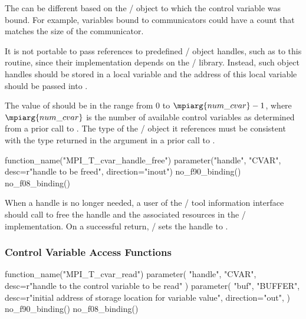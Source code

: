 \begin{users}
The  can be different based on the \MPI/ object to which the
control variable was bound.  For example, variables bound to communicators
could have a count that matches the size of the communicator.

It is not portable to pass references to predefined \MPI/ object handles,
such as  to this routine, since their
implementation depends on the \MPI/ library.  Instead, such object handles
should be stored in a local variable and the address of this local variable
should be passed into .
\end{users}

The value of  should be in the range from $0$ to
$\mpiarg{num\_cvar}-1$, where $\mpiarg{num\_cvar}$ is the number of available control
variables as determined from a prior call to
.  The type of the \MPI/ object it
references must be consistent with the type returned in the 
argument in a prior call to .

\begin{mpi-binding}
    function_name("MPI_T_cvar_handle_free")
    parameter("handle", "CVAR", desc=r"handle to be freed", direction="inout")
    no_f90_binding()
    no_f08_binding()
\end{mpi-binding}

When a handle is no longer needed, a user of the \MPI/ tool information
interface should call  to free the
handle and the associated resources in the \MPI/ implementation.  On a
successful return, \MPI/ sets the handle to
.


\subsubsection{Control Variable Access Functions}

\begin{mpi-binding}
    function_name("MPI_T_cvar_read")
    parameter(
        "handle", "CVAR", desc=r"handle to the control variable to be read"
    )
    parameter(
        "buf",
        "BUFFER",
        desc=r"initial address of storage location for variable value",
        direction="out",
    )
    no_f90_binding()
    no_f08_binding()
\end{mpi-binding}

